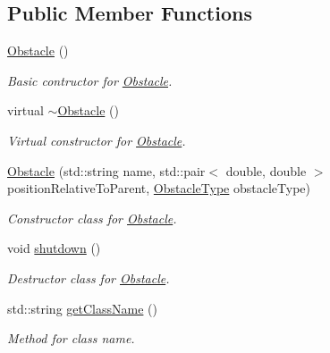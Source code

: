 \subsection*{Public Member Functions}
\begin{DoxyCompactItemize}
\item 
\hyperlink{class_azo_1_1_obstacle_a8f734072321fa06a7b7dae2d5f50f352}{Obstacle} ()
\begin{DoxyCompactList}\small\item\em Basic contructor for \hyperlink{class_azo_1_1_obstacle}{Obstacle}. \end{DoxyCompactList}\item 
virtual \hyperlink{class_azo_1_1_obstacle_af2f9cc9c6cff75dca0974fd5ac4f71a9}{$\sim$\+Obstacle} ()
\begin{DoxyCompactList}\small\item\em Virtual constructor for \hyperlink{class_azo_1_1_obstacle}{Obstacle}. \end{DoxyCompactList}\item 
\hyperlink{class_azo_1_1_obstacle_ac2605eab1c4049885e27749fe8bd4b14}{Obstacle} (std\+::string name, std\+::pair$<$ double, double $>$ position\+Relative\+To\+Parent, \hyperlink{namespace_azo_ac4ec77a26f64a5b7cd450e40dad04059}{Obstacle\+Type} obstacle\+Type)
\begin{DoxyCompactList}\small\item\em Constructor class for \hyperlink{class_azo_1_1_obstacle}{Obstacle}. \end{DoxyCompactList}\item 
void \hyperlink{class_azo_1_1_obstacle_aaff76ad6fd2803f73e941446e1724674}{shutdown} ()
\begin{DoxyCompactList}\small\item\em Destructor class for \hyperlink{class_azo_1_1_obstacle}{Obstacle}. \end{DoxyCompactList}\item 
std\+::string \hyperlink{class_azo_1_1_obstacle_a376685ade60d5c05661ce0bceab19da6}{get\+Class\+Name} ()
\begin{DoxyCompactList}\small\item\em Method for class name. \end{DoxyCompactList}\end{DoxyCompactItemize}
